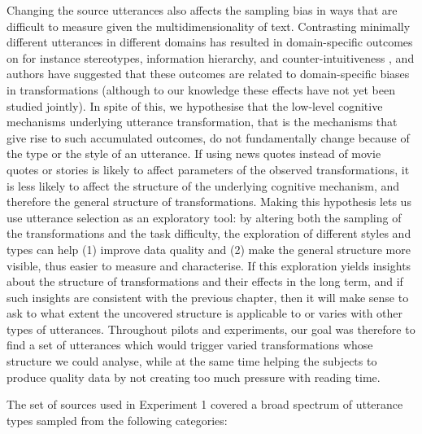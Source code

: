 Changing the source utterances also affects the sampling bias in ways
that are difficult to measure given the multidimensionality of text.
Contrasting minimally different utterances in different domains has
resulted in domain-specific outcomes on for instance stereotypes,
information hierarchy, and counter-intuitiveness
\autocites{kashima_maintaining_2000}{mesoudi_bias_2006}{barrett_spreading_2001}{mesoudi_multiple_2008},
and authors have suggested that these outcomes are related to
domain-specific biases in transformations (although to our knowledge
these effects have not yet been studied jointly). In spite of this, we
hypothesise that the low-level cognitive mechanisms underlying utterance
transformation, that is the mechanisms that give rise to such
accumulated outcomes, do not fundamentally change because of the type or
the style of an utterance. If using news quotes instead of movie quotes
or stories is likely to affect parameters of the observed
transformations, it is less likely to affect the structure of the
underlying cognitive mechanism, and therefore the general structure of
transformations. Making this hypothesis lets us use utterance selection
as an exploratory tool: by altering both the sampling of the
transformations and the task difficulty, the exploration of different
styles and types can help (1) improve data quality and (2) make the
general structure more visible, thus easier to measure and characterise.
If this exploration yields insights about the structure of
transformations and their effects in the long term, and if such insights
are consistent with the previous chapter, then it will make sense to ask
to what extent the uncovered structure is applicable to or varies with
other types of utterances. Throughout pilots and experiments, our goal
was therefore to find a set of utterances which would trigger varied
transformations whose structure we could analyse, while at the same time
helping the subjects to produce quality data by not creating too much
pressure with reading time.

The set of sources used in Experiment 1 covered a broad spectrum of
utterance types sampled from the following categories:

